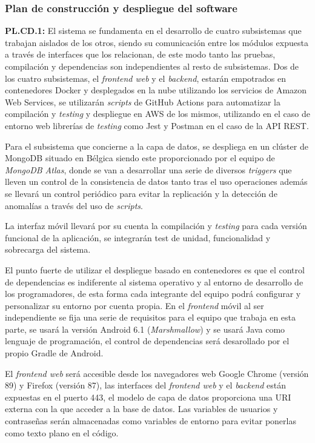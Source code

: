 \documentclass{article}
\begin{document}
\pagebreak
\subsubsection{Plan de construcción y despliegue del software}
 
\textbf{PL.CD.1: }
El sistema se fundamenta en el desarrollo de cuatro subsistemas que trabajan aislados de los otros, siendo su comunicación entre los módulos expuesta a través de interfaces que los relacionan, de este modo tanto las pruebas, compilación y dependencias son independientes al resto de subsistemas.
Dos de los cuatro subsistemas, el \textit{frontend web} y el \textit{backend}, estarán empotrados en contenedores Docker y desplegados en la nube utilizando los servicios de Amazon Web Services, se utilizarán \textit{scripts} de GitHub Actions para automatizar la compilación y \textit{testing} y despliegue en AWS de los mismos, utilizando en el caso de entorno web librerías de \textit{testing} como Jest y Postman en el caso de la API REST.
 
Para el subsistema que concierne a la capa de datos, se despliega en un clúster de MongoDB situado en Bélgica siendo este proporcionado por el equipo de \textit{MongoDB Atlas}, donde se van a desarrollar una serie de diversos \textit{triggers} que lleven un control de la consistencia de datos tanto tras el uso operaciones además se llevará un control periódico para evitar la replicación y la detección de anomalías a través del uso de \textit{scripts}.
 
La interfaz móvil llevará por su cuenta la compilación y \textit{testing} para cada versión funcional de la aplicación, se integrarán test de unidad, funcionalidad y sobrecarga del sistema.
 
El punto fuerte de utilizar el despliegue basado en contenedores es que el control de dependencias es indiferente al sistema operativo y al entorno de desarrollo de los programadores, de esta forma cada integrante del equipo podrá configurar y personalizar su entorno por cuenta propia. En el \textit{frontend} móvil al ser independiente se fija una serie de requisitos para el equipo que trabaja en esta parte, se usará la versión Android 6.1 (\textit{Marshmallow}) y se usará Java como lenguaje de programación, el control de dependencias será desarollado por el propio Gradle de Android.
 
El \textit{frontend web} será accesible desde los navegadores web Google Chrome (versión 89) y Firefox (versión 87), las interfaces del \textit{frontend web} y el \textit{backend} están expuestas en el puerto 443, el modelo de capa de datos proporciona una URI externa con la que acceder a la base de datos. Las variables de usuarios y contraseñas serán almacenadas como variables de entorno para evitar ponerlas como texto plano en el código.
 
\end{document}
